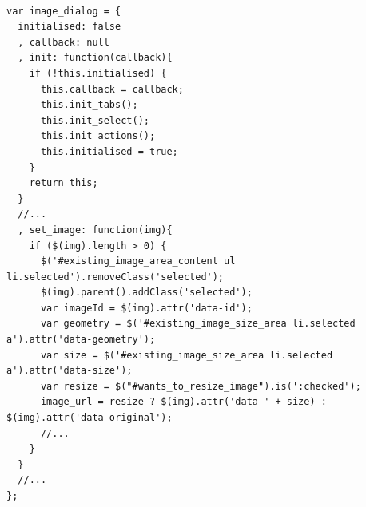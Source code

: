 \begin{lstlisting}[label=refineryoutput,caption=Beispiel für eine JavaScript-Funktion zur Realisierung des Bildauswahldialogs in Refinery CMS. Das Codebeispiel zeigt ebenfalls die Abhängigkeit zu dem verwendeten HTML-Markup (z.B. Zeile 18)]

var image_dialog = {
  initialised: false
  , callback: null
  , init: function(callback){
    if (!this.initialised) {
      this.callback = callback;
      this.init_tabs();
      this.init_select();
      this.init_actions();
      this.initialised = true;
    }
    return this;
  }
  //...
  , set_image: function(img){
    if ($(img).length > 0) {
      $('#existing_image_area_content ul li.selected').removeClass('selected');
      $(img).parent().addClass('selected');
      var imageId = $(img).attr('data-id');
      var geometry = $('#existing_image_size_area li.selected a').attr('data-geometry');
      var size = $('#existing_image_size_area li.selected a').attr('data-size');
      var resize = $("#wants_to_resize_image").is(':checked');
      image_url = resize ? $(img).attr('data-' + size) : $(img).attr('data-original');
      //...
    }
  }
  //...
};
\end{lstlisting}

